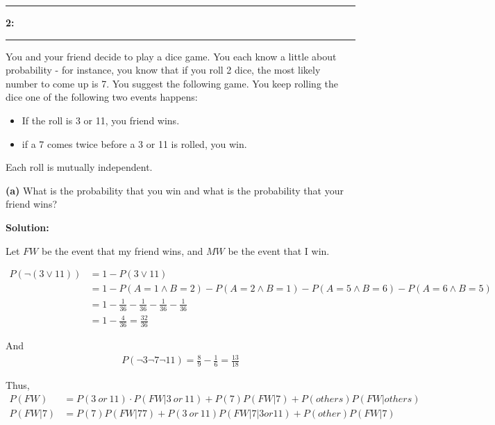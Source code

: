 \documentclass[11pt]{article}
\newcommand\question[2]{\vspace{.25in}\hrule\textbf{#1: #2}\vspace{.5em}\hrule\vspace{.10in}}
\renewcommand\part[1]{\vspace{.10in}\textbf{(#1)}}
\newcommand{\solution}{\vspace{.10in}\textbf{Solution: }}
\begin{document}
\raggedright
\newcommand\NAME{Carl Kingsford}  %
\newcommand\ANDREWID{ckingsf}     %
\newcommand\HWNUM{1}              %

\question{2}{}
You and your friend decide to play a dice game. You each know a little about
probability - for instance, you know that if you roll 2 dice, the most likely number to come up is 7.
You suggest the following game. You keep rolling the dice one of the following two events happens:
\begin{itemize}
    \item If the roll is 3 or 11, you friend wins.
    \item if a 7 comes twice before a 3 or 11 is rolled, you win.
\end{itemize}
Each roll is mutually independent.

\part{a} What is the probability that you win and what is the probability that your friend wins?

\solution

Let $FW$ be the event that my friend wins, and $MW$ be the event that I win.

\begin{align*}
        P(\lnot(3 \lor 11))   &= 1 - P(3 \lor 11) \\
           &= 1 - P(A = 1 \land B = 2) - P(A = 2 \land B = 1) - P(A = 5 \land B = 6) - P(A = 6 \land B = 5) \\
           &= 1 - \frac{1}{36} - \frac{1}{36} - \frac{1}{36} - \frac{1}{36} \\
           &= 1 - \frac{4}{36}  = \frac{32}{36}
\end{align*}

And 
\begin{align*}
    P(\lnot 3 \lnot 7 \lnot 11) = \frac{8}{9} - \frac{1}{6} = \frac{13}{18}
\end{align*}

Thus,
\begin{align*}
    P(FW) &= P\left( 3\  or\  11\right)  \cdot P\left( FW|3\  or\  11\right)  +P\left( 7\right)  P\left( FW|7\right) + P(others) P(FW|others) \\
    P\left( FW|7\right)  &= P\left( 7\right)  P\left( FW|77\right)  +P\left( 3\  or\  11\right)  P\left( FW|7|3or11\right)  +P\left( other\right)  P\left( FW|7\right)
\end{align*}
\end{document}

